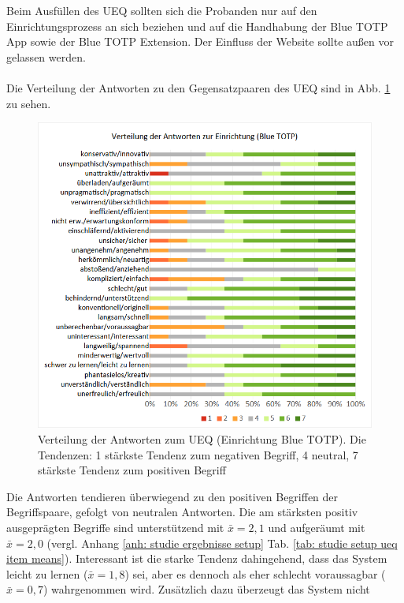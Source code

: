 Beim Ausfüllen des UEQ sollten sich die Probanden nur auf den 
Einrichtungsprozess an sich beziehen und auf die Handhabung der 
Blue TOTP App sowie der Blue TOTP Extension. Der Einfluss der 
Website sollte außen vor gelassen werden.
\\\\
Die Verteilung der Antworten zu den Gegensatzpaaren des UEQ sind in Abb. \ref{fig: studie setup ueq dist} zu sehen.
\begin{figure}[h]
    \centering
    \includegraphics[width=.9\linewidth]{data_processing/questionaires/results/figures_from_excel/setup_ueq_distribution.png}
    \caption[Verteilung der Antworten zum UEQ (Einrichtung Blue TOTP)]{Verteilung der Antworten zum UEQ (Einrichtung Blue TOTP). Die Tendenzen: 1 stärkste Tendenz zum negativen Begriff, 4 neutral, 7 stärkste Tendenz zum positiven Begriff}
    \label{fig: studie setup ueq dist}
\end{figure}
Die Antworten tendieren überwiegend zu den positiven Begriffen 
der Begriffspaare, gefolgt von neutralen Antworten. Die am 
stärksten positiv ausgeprägten Begriffe sind \glqq unterstützend\grqq{} mit 
$\bar{x} = 2{,}1$ und \glqq aufgeräumt\grqq{} mit $\bar{x} = 2{,}0$ (vergl. Anhang 
\ref{anh: studie ergebnisse setup} Tab. \ref{tab: studie setup ueq item 
means}). Interessant  ist die starke Tendenz dahingehend, dass 
das System \glqq leicht zu lernen\grqq{} ($\bar{x} = 1{,}8$) sei, aber es 
dennoch als eher schlecht \glqq voraussagbar\grqq{} ($\bar{x} = 0{,}7$) 
wahrgenommen wird. Zusätzlich dazu überzeugt das System nicht 
